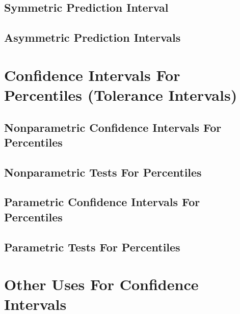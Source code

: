 \documentclass[]{book}
\begin{document}
\hypertarget{symmetric-prediction-interval}{%
\subsection{Symmetric Prediction Interval}\label{symmetric-prediction-interval}}

\hypertarget{asymmetric-prediction-intervals}{%
\subsection{Asymmetric Prediction Intervals}\label{asymmetric-prediction-intervals}}

\hypertarget{confidence-intervals-for-percentiles-tolerance-intervals}{%
\section{Confidence Intervals For Percentiles (Tolerance Intervals)}\label{confidence-intervals-for-percentiles-tolerance-intervals}}

\hypertarget{nonparametric-confidence-intervals-for-percentiles}{%
\subsection{Nonparametric Confidence Intervals For Percentiles}\label{nonparametric-confidence-intervals-for-percentiles}}

\hypertarget{nonparametric-tests-for-percentiles}{%
\subsection{Nonparametric Tests For Percentiles}\label{nonparametric-tests-for-percentiles}}

\hypertarget{parametric-confidence-intervals-for-percentiles}{%
\subsection{Parametric Confidence Intervals For Percentiles}\label{parametric-confidence-intervals-for-percentiles}}

\hypertarget{parametric-tests-for-percentiles}{%
\subsection{Parametric Tests For Percentiles}\label{parametric-tests-for-percentiles}}

\hypertarget{other-uses-for-confidence-intervals}{%
\section{Other Uses For Confidence Intervals}\label{other-uses-for-confidence-intervals}}
\end{document}
